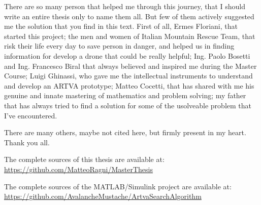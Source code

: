 \begin{aknowledgements}
\noindent
There are so many person that helped me through this journey, that I should write an entire thesis only to name them all. But few of them actively suggested me the solution that you find in this text. First of all, Ermes Floriani, that started this project; the men and women of Italian Mountain Rescue Team, that risk their life every day to save person in danger, and helped us in finding information for develop a drone that could be really helpful; Ing. Paolo Bosetti and Ing. Francesco Biral that always believed and inspired me during the Master Course; Luigi Ghinassi, who gave me the intellectual instruments to understand and develop an ARTVA prototype; Matteo Cocetti, that has shared with me his genuine and innate mastering of mathematics and problem solving; my father that has always tried to find a solution for some of the usolveable problem that I've encountered.

\noindent
There are many others, maybe not cited here, but firmly present in my heart. Thank you all.

\scriptsize{The complete sources of this thesis are available at: \url{https://github.com/MatteoRagni/MasterThesis}}

\scriptsize{The complete sources of the MATLAB/Simulink project are available at: \url{https://github.com/AvalancheMustache/ArtvaSearchAlgorithm}}
\end{aknowledgements}

